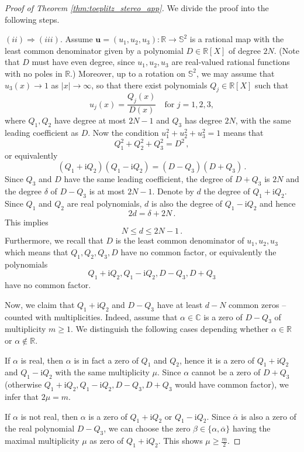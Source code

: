 \documentclass[10pt,a4paper]{amsart}
\newcommand{\C}{\mathbb{C}}
\newcommand{\R}{\mathbb{R}}
\newcommand{\Ss}{\mathbb{S}}
\newcommand{\ii}{\mathrm{i}}
\newcommand{\ov}{\overline}
\newcommand{\uu}{\mathbf{u}}
\renewcommand{\geq}{\geqslant}
\renewcommand{\leq}{\leqslant}
\begin{document}
\begin{proof}[Proof of Theorem \ref{thm:toeplitz_stereo_app}]
We divide the proof into the following steps.

\medskip
\textbf{$(ii) \Rightarrow (iii)$}. Assume $\uu = (u_1, u_2, u_3) : \R \to \Ss^2$ is a rational map with the least common denominator given by a polynomial $D \in \R[X]$ of degree $2N$. (Note that $D$ must have even degree, since $u_1, u_2, u_3$ are real-valued rational functions with no poles in $\R$.) Moreover, up to a rotation on $\Ss^2$, we may assume that $u_3(x) \to 1$ as $|x| \to \infty$, so that there exist polynomials $Q_j \in \R[X]$ such that
$$
u_j(x) = \frac{Q_j(x)}{D(x)} \quad \mbox{for $j=1,2,3$},
$$
where $Q_1, Q_2$ have degree at most $2N-1$ and $Q_3$ has degree $2N$, with the same leading coefficient as $D$. Now the condition $u_1^2 + u_2^2 + u_3^2 = 1$ means that
$$
Q_1^2 + Q_2^2 + Q_3^2 = D^2 \, , 
$$
or equivalently
$$
(Q_1 + \ii Q_2)(Q_1 - \ii Q_2) = (D-Q_3)(D+Q_3) \, .
$$
Since $Q_3$ and $D$ have the same leading coefficient, the degree of $D+Q_3$ is $2N$ and the degree $\delta$ of $D-Q_3$ is at most $2N-1$. Denote by $d$ the degree of $Q_1 + \ii Q_2$. Since $Q_1$ and $Q_2$ are real polynomials, $d$ is also the degree of $Q_1 - \ii Q_2$ and hence
$$
2d = \delta + 2N \, .
$$
This implies
$$
N \leq d \leq 2N-1 \, .
$$
Furthermore, we recall that $D$ is the least common denominator of $u_1, u_2, u_3$ which means that $Q_1, Q_2, Q_3, D$ have no common factor, or equivalently the polynomials
$$
Q_1+ \ii Q_2, Q_1 - \ii Q_2, D-Q_3, D + Q_3
$$
have no common factor.

Now, we claim that $Q_1 + \ii Q_2$ and $D-Q_3$ have at least $d-N$ common zeros -- counted with multiplicities. Indeed, assume that $\alpha \in \C$ is a zero of $D-Q_3$ of multiplicity $m \geq 1$. We distinguish the following cases depending whether $\alpha \in \R$ or $\alpha \not \in \R$.

If $\alpha$ is real, then $\alpha$ is in fact a zero of $Q_1$ and $Q_2$, hence it is a zero of $Q_1+\ii Q_2$ and $Q_1 -\ii Q_2$ with the same multiplicity $\mu$. Since $\alpha$ cannot be a zero of $D+Q_3$ (otherwise $Q_1+\ii Q_2, Q_1 - \ii Q_2, D-Q_3, D+ Q_3$ would have common factor), we infer that $2 \mu = m$. 

If $\alpha$ is not real, then $\alpha$ is a zero of $Q_1 + \ii Q_2$ or $Q_1 - \ii Q_2$. Since $\ov{\alpha}$ is also a zero of the real polynomial $D-Q_3$, we can choose the zero $\beta \in \{ \alpha, \ov{\alpha} \}$ having the maximal multiplicity $\mu$ as zero of $Q_1 + \ii Q_2$. This shows $\mu \geq \frac{m}{2}$.


\end{proof}
\end{document}
